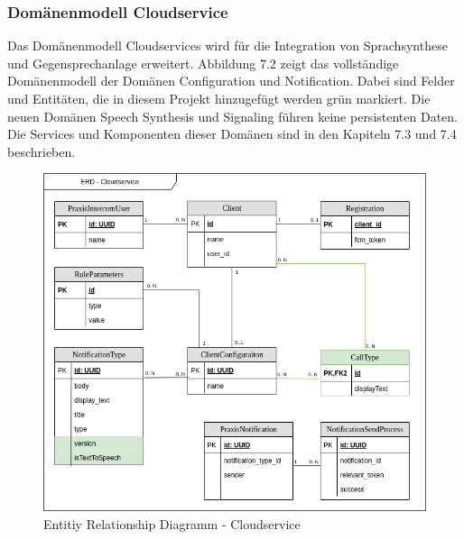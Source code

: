 \clearpage

\subsubsection{Domänenmodell Cloudservice}

Das Domänenmodell Cloudservices wird für die Integration von Sprachsynthese und Gegensprechanlage erweitert.
Abbildung 7.2 zeigt das vollständige Domänenmodell der Domänen Configuration und Notification.
Dabei sind Felder und Entitäten, die in diesem Projekt hinzugefügt werden grün markiert.
Die neuen Domänen Speech Synthesis und Signaling führen keine persistenten Daten.
Die Services und Komponenten dieser Domänen sind in den Kapiteln 7.3 und 7.4 beschrieben.

\begin{figure}[h]
    \centering
    \begin{minipage}[b]{0.9\textwidth}
        \includegraphics[width=\textwidth]{graphics/diagramms/erd_v02}
        \caption{Entitiy Relationship Diagramm - Cloudservice}
    \end{minipage}
\end{figure}

\clearpage
